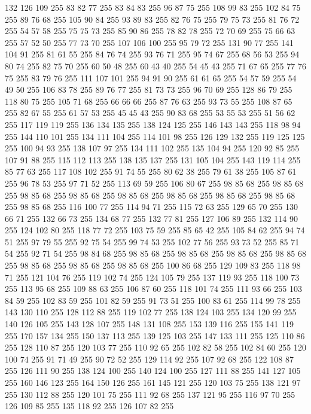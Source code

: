 132 126 109 255 83 82 77 255 83 84 83 255 96 87 75 255 108 99 83 255 102 84 75 255 89 76 68 255 105 90 84 255 93 89 83 255 82 76 75 255 79 75 73 255 81 76 72 255 54 57 58 255 75 75 73 255 85 90 86 255 78 82 78 255 72 70 69 255 75 66 63 255 57 52 50 255 77 73 70 255 107 106 100 255 95 79 72 255 131 90 77 255 141 104 91 255 81 61 55 255 84 76 74 255 93 76 71 255 95 74 67 255 68 56 53 255 94 80 74 255 82 75 70 255 60 50 48 255 60 43 40 255 54 45 43 255 71 67 65 255 77 76 75 255 83 79 76 255 111 107 101 255 94 91 90 255 61 61 65 255 54 57 59 255 54 49 50 255 106 83 78 255 89 76 77 255 81 73 73 255 96 70 69 255 128 86 79 255 118 80 75 255 105 71 68 255 66 66 66 255 87 76 63 255 93 73 55 255 108 87 65 255 82 67 55 255 61 57 53 255 45 45 43 255 90 83 68 255 53 55 53 255 51 56 62 255 117 119 119 255 136 134 135 255 138 124 125 255 146 143 143 255 118 98 94 255
144 110 101 255 134 111 104 255 114 101 98 255 126 129 132 255 119 125 125 255 100 94 93 255 138 107 97 255 134 111 102 255 135 104 94 255 120 92 85 255 107 91 88 255 115 112 113 255 138 135 137 255 131 105 104 255 143 119 114 255 85 77 63 255 117 108 102 255 91 74 55 255 80 62 38 255 79 61 38 255 105 87 61 255 96 78 53 255 97 71 52 255 113 69 59 255 106 80 67 255 98 85 68 255 98 85 68 255 98 85 68 255 98 85 68 255 98 85 68 255 98 85 68 255 98 85 68 255 98 85 68 255 98 85 68 255 116 100 77 255 114 94 71 255 115 72 63 255 129 65 70 255 130 66 71 255 132 66 73 255 134 68 77 255 132 77 81 255 127 106 89 255 132 114 90 255 124 102 80 255 118 77 72 255 103 75 59 255 85 65 42 255 105 84 62 255 94 74 51 255 97 79 55 255 92 75 54 255 99 74 53 255 102 77 56 255 93 73 52 255 85 71 54 255 92 71 54 255 98 84 68 255 98 85 68 255 98 85 68 255 98 85 68 255 98 85 68 255 98 85 68 255 98 85 68 255
98 85 68 255 100 86 68 255 129 109 83 255 118 98 71 255 121 104 76 255 119 102 74 255 124 105 79 255 137 119 93 255 118 100 73 255 113 95 68 255 109 88 63 255 106 87 60 255 118 101 74 255 111 93 66 255 103 84 59 255 102 83 59 255 101 82 59 255 91 73 51 255 100 83 61 255 114 99 78 255 143 130 110 255 128 112 88 255 119 102 77 255 138 124 103 255 134 120 99 255 140 126 105 255 143 128 107 255 148 131 108 255 153 139 116 255 155 141 119 255 170 157 134 255 150 137 113 255 139 125 103 255 147 133 111 255 125 110 86 255 128 110 87 255 120 103 77 255 110 92 65 255 102 82 58 255 102 84 60 255 120 100 74 255 91 71 49 255 90 72 52 255 129 114 92 255 107 92 68 255 122 108 87 255 126 111 90 255 138 124 100 255 140 124 100 255 127 111 88 255 141 127 105 255 160 146 123 255 164 150 126 255 161 145 121 255 120 103 75 255 138 121 97 255 130 112 88 255 120 101 75 255 111 92 68 255 137 121 95 255 116 97 70 255 126 109 85 255 135 118 92 255 126 107 82 255
